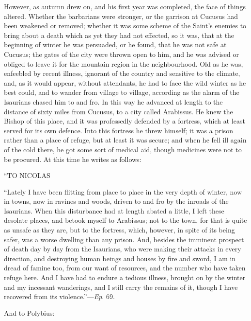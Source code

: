 However, as autumn drew on, and his first year was completed, the
face of things altered. Whether the barbarians were stronger, or the
garrison at Cucusus had been weakened or removed; whether it was some
scheme of the Saint's enemies to bring about a death which as yet they
had not effected, so it was, that at the beginning of winter he was
persuaded, or he found, that he was not safe at Cucusus; the gates of
the city were thrown open to him, and he was advised or obliged to
leave it for the mountain region in the neighbourhood. Old as he was,
enfeebled by recent illness, ignorant of the country and sensitive to
the climate, and, as it would appear, without attendants, he had
to face the wild winter as he best could, and to wander from village
to village, according as the alarm of the Isaurians chased him to and
fro. In this way he advanced at length to the distance of sixty miles
from Cucusus, to a city called Arabissus. He knew the Bishop of this
place, and it was professedly defended by a fortress, which at least
served for its own defence. Into this fortress he threw himself; it
was a prison rather than a place of refuge, but at least it was
secure; and when he fell ill again of the cold there, he got some sort
of medical aid, though medicines were not to be procured. At this time
he writes as follows:

``TO
NICOLAS

``Lately I have been flitting from place to place in the very
depth of winter, now in towns, now in ravines and woods, driven to and
fro by the inroads of the Isaurians. When this disturbance had at
length abated a little, I left these desolate places, and betook
myself to Arabissus; not to the town, for that is quite as unsafe as
they are, but to the fortress, which, however, in spite of its being
safer, was a worse dwelling than any prison. And, besides the imminent
prospect of death day by day from the Isaurians, who were making their
attacks in every direction, and destroying human beings and houses by
fire and sword, I am in dread of famine too, from our want of
resources, and the number who have taken refuge here. And I have had
to endure a tedious illness, brought on by the winter and my incessant
wanderings, and I still carry the remains of it, though I have
recovered from its violence.''—\emph{Ep}. 69.

And to Polybius:


